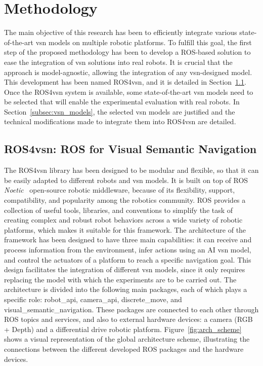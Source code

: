 \section{Methodology}\label{sec:methodology}
The main objective of this research has been to efficiently integrate various state-of-the-art \acrshort{vsn} models on multiple robotic platforms.
To fulfill this goal, the first step of the proposed methodology has been to develop a ROS-based solution to ease the integration of \acrshort{vsn} solutions into real robots.
It is crucial that the approach is model-agnostic, allowing the integration of any \acrshort{vsn}-designed model.
This development has been named ROS4\acrshort{vsn}, and it is detailed in Section~\ref{subsec:ros4vsn}.
Once the ROS4\acrshort{vsn} system is available, some state-of-the-art \acrshort{vsn} models need to be selected that will enable the experimental evaluation with real robots.
In Section~\ref{subsec:vsn_models}, the selected \acrshort{vsn} models are justified and the technical modifications made to integrate them into ROS4\acrshort{vsn} are detailed.


\subsection{ROS4\acrshort{vsn}: ROS for Visual Semantic Navigation}
\label{subsec:ros4vsn}

The ROS4\acrshort{vsn} library has been designed to be modular and flexible, so that it can be easily adapted to different robots and \acrshort{vsn} models.
It is built on top of ROS \textit{Noetic}~\cite{ros} open-source robotic middleware, because of its flexibility, support, compatibility, and popularity among the robotics community.
ROS provides a collection of useful tools, libraries, and conventions to simplify the task of creating complex and robust robot behaviors across a wide variety of robotic platforms, which makes it suitable for this framework.
The architecture of the framework has been designed to have three main capabilities: it can receive and process information from the environment, infer actions using an AI \acrshort{vsn} model, and control the actuators of a platform to reach a specific navigation goal.
This design facilitates the integration of different \acrshort{vsn} models, since it only requires replacing the model with which the experiments are to be carried out.
The architecture is divided into the following main packages, each of which plays a specific role: robot\_api, camera\_api, discrete\_move, and visual\_semantic\_navigation.
These packages are connected to each other through ROS topics and services, and also to external hardware devices: a camera (RGB + Depth) and a differential drive robotic platform.
Figure~\ref{fig:arch_scheme} shows a visual representation of the global architecture scheme, illustrating the connections between the different developed ROS packages and the hardware devices.

